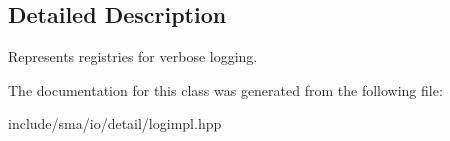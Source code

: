 \subsection{Detailed Description}
Represents registries for verbose logging. 

The documentation for this class was generated from the following file\-:\begin{DoxyCompactItemize}
\item 
include/sma/io/detail/logimpl.\-hpp\end{DoxyCompactItemize}
